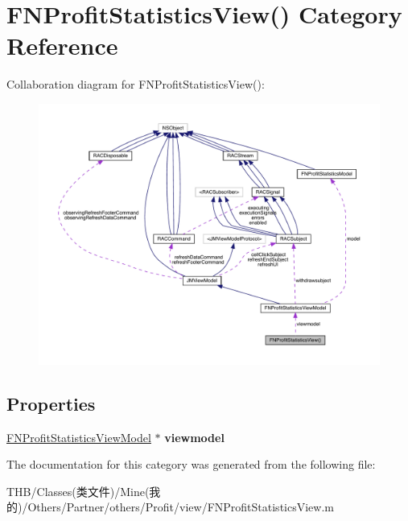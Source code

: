 \hypertarget{category_f_n_profit_statistics_view_07_08}{}\section{F\+N\+Profit\+Statistics\+View() Category Reference}
\label{category_f_n_profit_statistics_view_07_08}


Collaboration diagram for F\+N\+Profit\+Statistics\+View()\+:\nopagebreak
\begin{figure}[H]
\begin{center}
\leavevmode
\includegraphics[width=350pt]{category_f_n_profit_statistics_view_07_08__coll__graph}
\end{center}
\end{figure}
\subsection*{Properties}
\begin{DoxyCompactItemize}
\item 
\mbox{\label{category_f_n_profit_statistics_view_07_08_afe00718f4b766655e5db12af954aab49}} 
\mbox{\hyperlink{interface_f_n_profit_statistics_view_model}{F\+N\+Profit\+Statistics\+View\+Model}} $\ast$ {\bfseries viewmodel}
\end{DoxyCompactItemize}


The documentation for this category was generated from the following file\+:\begin{DoxyCompactItemize}
\item 
T\+H\+B/\+Classes(类文件)/\+Mine(我的)/\+Others/\+Partner/others/\+Profit/view/F\+N\+Profit\+Statistics\+View.\+m\end{DoxyCompactItemize}
